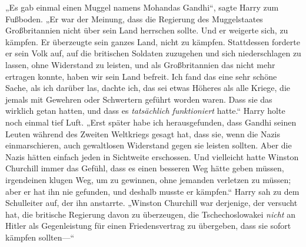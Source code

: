 „Es gab einmal einen Muggel namens Mohandas Gandhi“, sagte Harry zum Fußboden. „Er war der Meinung, dass die Regierung des Muggelstaates Großbritannien nicht über sein Land herrschen sollte.%
Und er weigerte sich, zu kämpfen. Er überzeugte sein ganzes Land, nicht zu kämpfen. Stattdessen forderte er sein Volk auf, auf die britischen Soldaten zuzugehen und sich niederschlagen zu lassen, ohne Widerstand zu leisten, und als Großbritannien das nicht mehr ertragen konnte, haben wir sein Land befreit. Ich fand das eine sehr schöne Sache, als ich darüber las, dachte ich, das sei etwas Höheres als alle Kriege, die jemals mit Gewehren oder Schwertern geführt worden waren. Dass sie das wirklich getan hatten, und dass es \emph{tatsächlich funktioniert} hatte.“ Harry holte noch einmal tief Luft. „Erst später habe ich herausgefunden, dass Gandhi seinen Leuten während des Zweiten Weltkriegs gesagt hat, dass sie, wenn die Nazis einmarschieren, auch gewaltlosen Widerstand gegen sie leisten sollten. Aber die Nazis hätten einfach jeden in Sichtweite erschossen. Und vielleicht hatte Winston Churchill immer das Gefühl, dass es einen besseren Weg hätte geben müssen, irgendeinen klugen Weg, um zu gewinnen, ohne jemanden verletzen zu müssen; aber er hat ihn nie gefunden, und deshalb musste er kämpfen.“ Harry sah zu dem Schulleiter auf, der ihn anstarrte. „Winston Churchill war derjenige, der versucht hat, die britische Regierung davon zu überzeugen, die Tschechoslowakei \emph{nicht} an Hitler als Gegenleistung für einen Friedensvertrag zu übergeben, dass sie sofort kämpfen sollten—“

